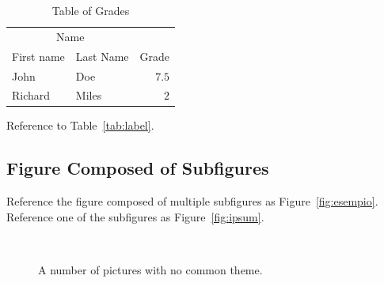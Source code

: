 \documentclass[
10pt, %
a4paper, %
oneside, %
headinclude,footinclude, %
BCOR5mm, %
]{scrartcl}
\begin{document}

\begin{table}[hbt]
\caption{Table of Grades}
\centering
\begin{tabular}{llr}
\toprule
\multicolumn{2}{c}{Name} \\
\cmidrule(r){1-2}
First name & Last Name & Grade \\
\midrule
John & Doe & $7.5$ \\
Richard & Miles & $2$ \\
\bottomrule
\end{tabular}
\label{tab:label}
\end{table}

Reference to Table~\vref{tab:label}. %


\subsection{Figure Composed of Subfigures}

Reference the figure composed of multiple subfigures as Figure~\vref{fig:esempio}. Reference one of the subfigures as Figure~\vref{fig:ipsum}. %


\begin{figure}[tb]
\centering
{} \quad
{} \\
 \quad
{}
\caption[A number of pictures.]{A number of pictures with no common theme.} %
\label{fig:esempio}
\end{figure}


\renewcommand{\refname}{\spacedlowsmallcaps{References}} %




\end{document}
